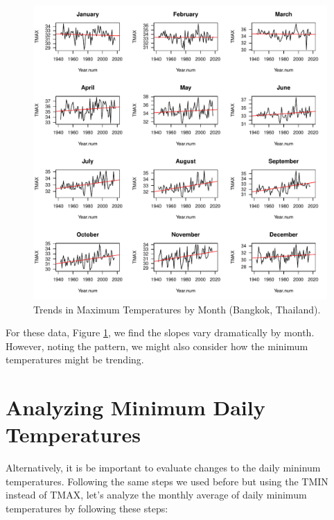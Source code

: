 \documentclass{article}\usepackage[]{graphicx}\usepackage[]{color}
\makeatletter
\def\maxwidth{ %
  \ifdim\Gin@nat@width>\linewidth
    \linewidth
  \else
    \Gin@nat@width
  \fi
}
\newenvironment{knitrout}{}{} %
\makeatother
\begin{document}
\begin{figure}

\begin{knitrout}
\color{fgcolor}
\includegraphics[width=\maxwidth]{figure/12MonthsTMAX-1} 

\end{knitrout}
\caption{Trends in Maximum Temperatures by Month (Bangkok, Thailand).}
\label{fig:MonthlyTMAX}
\end{figure}

For these data, Figure \ref{fig:MonthlyTMAX}, we find the slopes vary dramatically by month. However, noting the pattern, we might also consider how the minimum temperatures might be trending.

\section{Analyzing Minimum Daily Temperatures}

Alternatively, it is be important to evaluate changes to the daily mininum temperatures. Following the same steps we used before but using the TMIN instead of TMAX, let's analyze the monthly average of daily minimum temperatures by following these steps: 
\end{document}
